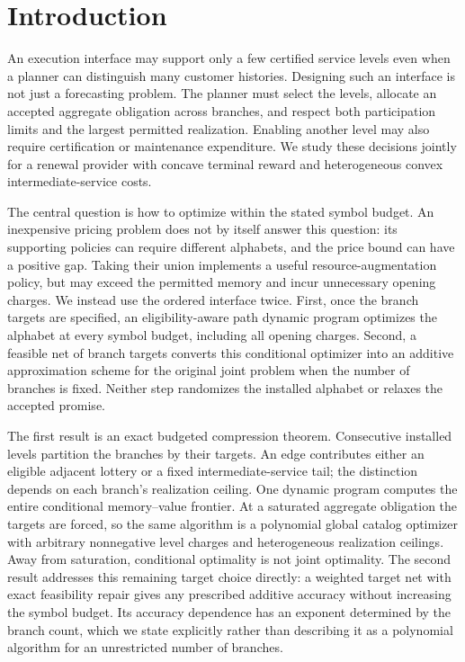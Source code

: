 \section{Introduction}
An execution interface may support only a few certified service levels even when a planner can distinguish many customer histories. Designing such an interface is not just a forecasting problem. The planner must select the levels, allocate an accepted aggregate obligation across branches, and respect both participation limits and the largest permitted realization. Enabling another level may also require certification or maintenance expenditure. We study these decisions jointly for a renewal provider with concave terminal reward and heterogeneous convex intermediate-service costs.

The central question is how to optimize within the stated symbol budget. An inexpensive pricing problem does not by itself answer this question: its supporting policies can require different alphabets, and the price bound can have a positive gap. Taking their union implements a useful resource-augmentation policy, but may exceed the permitted memory and incur unnecessary opening charges. We instead use the ordered interface twice. First, once the branch targets are specified, an eligibility-aware path dynamic program optimizes the alphabet at every symbol budget, including all opening charges. Second, a feasible net of branch targets converts this conditional optimizer into an additive approximation scheme for the original joint problem when the number of branches is fixed. Neither step randomizes the installed alphabet or relaxes the accepted promise.

The first result is an exact budgeted compression theorem. Consecutive installed levels partition the branches by their targets. An edge contributes either an eligible adjacent lottery or a fixed intermediate-service tail; the distinction depends on each branch's realization ceiling. One dynamic program computes the entire conditional memory--value frontier. At a saturated aggregate obligation the targets are forced, so the same algorithm is a polynomial global catalog optimizer with arbitrary nonnegative level charges and heterogeneous realization ceilings. Away from saturation, conditional optimality is not joint optimality. The second result addresses this remaining target choice directly: a weighted target net with exact feasibility repair gives any prescribed additive accuracy without increasing the symbol budget. Its accuracy dependence has an exponent determined by the branch count, which we state explicitly rather than describing it as a polynomial algorithm for an unrestricted number of branches.

